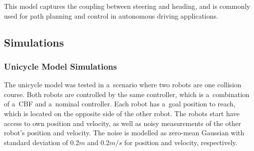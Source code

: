 \documentclass{svproc}
\begin{document}
        This model captures the coupling between steering and heading,
        and is commonly used for path planning and control in autonomous
        driving applications.
        
    \subsection{Simulations}
        \subsubsection{Unicycle Model Simulations}
        The unicycle model was tested in a~scenario where two robots are one
        collision course. Both robots are controlled by the same
        controller, which is a~combination of a~CBF and a~nominal
        controller. Each robot has a~goal position to reach, which is
        located on the opposite side of the other robot. The robots start
        have access to own position and velocity, as well as noisy
        measurements of the other robot's position and velocity. The noise
        is modelled as zero-mean Gaussian with standard deviation of $0.2 m$
        and $0.2 m/s$ for position and velocity, respectively.
\end{document}
